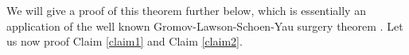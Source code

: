 We will give a proof of this theorem further below, which is essentially an application of the well known Gromov-Lawson-Schoen-Yau surgery theorem \cite{SchoenYau1979, gromov_lawson_surgerytheorem}. Let us now proof Claim \ref{claim1} and Claim \ref{claim2}.


